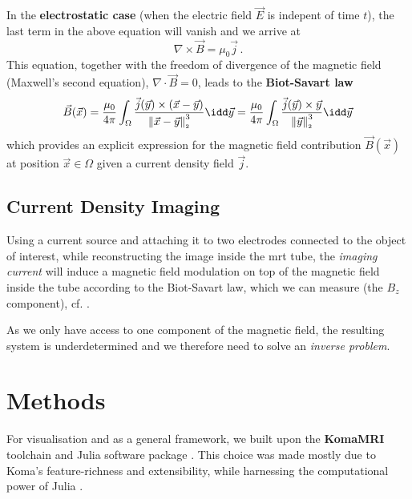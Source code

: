 \documentclass[10pt]{article}
\renewcommand{\norm}[1]{\left\lVert#1\right\rVert_{\scriptscriptstyle 2}}
\begin{document}
  In the \textbf{electrostatic case} (when the electric field $\vec{E}$ is indepent of time $t$), the last term in the above equation will vanish and we arrive at
  \begin{equation}
    \nabla \times \vec{B} = \mu_0 \vec{j}\,.
    \label{eq:maxwell-4-electrostatic}
  \end{equation}
  This equation, together with the freedom of divergence of the magnetic field (Maxwell's second equation), $\nabla \cdot \vec{B} = 0$, leads to the \textbf{Biot-Savart law}
  \begin{equation}
    \vec{B}(\vec{x})
    = \frac{\mu_0}{4\pi} \int_\Omega \frac{\vec{j}(\vec{y}) \times (\vec{x} - \vec{y})}{\norm{\vec{x} - \vec{y}}^3} \idd\vec{y}
    = \frac{\mu_0}{4\pi} \int_\Omega \frac{\vec{j}(\vec{y}) \times \vec{y}}{\norm{\vec{y}}^3} \idd\vec{y}
    \label{eq:biot-savart}
  \end{equation}
  which provides an explicit expression for the magnetic field contribution $\vec{B}(\vec{x})$ at position $\vec{x} \in \Omega$ given a current density field $\vec{j}$.

  \subsection{Current Density Imaging}
  Using a current source and attaching it to two electrodes connected to the object of interest, while reconstructing the image inside the \gls{mrt} tube, the \textit{imaging current} will induce a magnetic field modulation on top of the magnetic field inside the tube according to the Biot-Savart law, which we can measure (the $B_z$ component), cf. \cite{2004-mrcdi-from-one-var}.

  As we only have access to one component of the magnetic field, the resulting system is underdetermined and we therefore need to solve an \textit{inverse problem}.

  \section{Methods}
  For visualisation and as a general framework, we built upon the \textbf{KomaMRI} toolchain and Julia software package \parencite{2022-koma-mri}.
  This choice was made mostly due to Koma's feature-richness and extensibility, while harnessing the computational power of Julia \parencite{2017-julia}.
\end{document}
